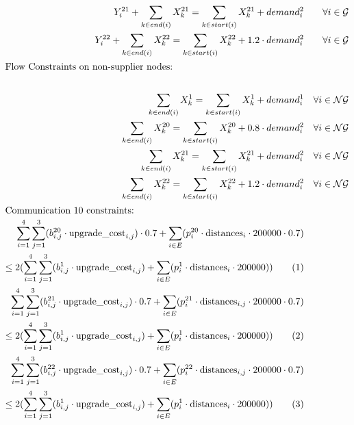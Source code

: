\documentclass{article}
\begin{document}
\begin{align*}
		Y^{21}_i + \sum_{k \in end(i)} X^{21}_{k} =
		\sum_{k \in start(i)} X^{21}_{k} + demand^{2}_{i} &&\forall i\in \mathcal{G} \\
		Y^{22}_i + \sum_{k \in end(i)} X^{22}_{k} =
		\sum_{k \in start(i)} X^{22}_{k} + 1.2 \cdot demand^{2}_{i} &&\forall i\in \mathcal{G} \\
		\intertext{Flow Constraints on non-supplier nodes:}\\ 
		\sum_{k \in end(i)} X^{1}_{k} =
		\sum_{k \in start(i)} X^{1}_{k} + demand^{1}_{i} &&\forall i\in \mathcal{NG} \\
		\sum_{k \in end(i)} X^{20}_{k} =
		\sum_{k \in start(i)} X^{20}_{k} + 0.8 \cdot demand^{2}_{i} &&\forall i\in \mathcal{NG} \\
		\sum_{k \in end(i)} X^{21}_{k} =
		\sum_{k \in start(i)} X^{21}_{k} + demand^{2}_{i} &&\forall i\in \mathcal{NG} \\
		\sum_{k \in end(i)} X^{22}_{k} =
		\sum_{k \in start(i)} X^{22}_{k} + 1.2 \cdot demand^{2}_{i} &&\forall i\in \mathcal{NG} \\
		\intertext{Communication 10 constraints:}
		\sum_{i = 1}^{4} \sum_{j = 1}^{3} (b^{20}_{i,j}  \cdot \text{upgrade\_cost}_{i,j}) \cdot 0.7 +  \sum_{i \in E} (p^{20}_i \cdot \text{distances}_{i} \cdot 200000 \cdot 0.7) \\ \leq
		2(\sum_{i = 1}^{4} \sum_{j = 1}^{3} (b^{1}_{i,j}  \cdot \text{upgrade\_cost}_{i,j}) + \sum_{i \in E} (p^{1}_i \cdot \text{distances}_{i} \cdot 200000)) \tag{1} \\
		\sum_{i = 1}^{4} \sum_{j = 1}^{3} (b^{21}_{i,j}  \cdot \text{upgrade\_cost}_{i,j}) \cdot 0.7 +  \sum_{i \in E} (p^{21}_i \cdot \text{distances}_{i,j} \cdot 200000 \cdot 0.7) \\ \leq
		2(\sum_{i = 1}^{4} \sum_{j = 1}^{3} (b^{1}_{i,j}  \cdot \text{upgrade\_cost}_{i,j}) + \sum_{i \in E} (p^{1}_i \cdot \text{distances}_{i} \cdot 200000)) \tag{2}\\
		\sum_{i = 1}^{4} \sum_{j = 1}^{3} (b^{22}_{i,j}  \cdot \text{upgrade\_cost}_{i,j}) \cdot 0.7 +  \sum_{i \in E} (p^{22}_i \cdot \text{distances}_{i,j} \cdot 200000 \cdot 0.7) \\ \leq
		2(\sum_{i = 1}^{4} \sum_{j = 1}^{3} (b^{1}_{i,j}  \cdot \text{upgrade\_cost}_{i,j}) + \sum_{i \in E} (p^{1}_i \cdot \text{distances}_{i} \cdot 200000)) \tag{3}
	\end{align*}
\end{document}

